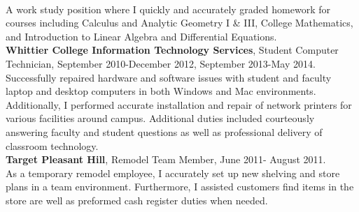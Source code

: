 \documentclass[letterpaper]{article}
\begin{document}
\\{\small A work study position where I quickly and accurately graded homework for courses including Calculus and Analytic Geometry I \& III, College Mathematics, and Introduction to Linear Algebra and Differential Equations.}\vspace{.2cm}\\
{\bf Whittier College Information Technology Services},  Student Computer Technician,
	 September 2010-December 2012, September 2013-May 2014. \\
{\small Successfully repaired hardware and software issues with student and faculty laptop and desktop computers in both Windows and Mac environments. Additionally, I performed accurate installation and repair of network printers for various facilities around campus. Additional duties included courteously answering faculty and student questions as well as professional delivery of classroom technology. }\vspace{.2cm} \\
{\bf Target Pleasant Hill}, Remodel Team Member,
	 June 2011- August 2011.  
\\{\small As a temporary remodel employee, I  accurately set up new shelving and store plans in a team environment. Furthermore, I assisted customers find items in the store are well as preformed cash register duties when needed.}
\end{document}
